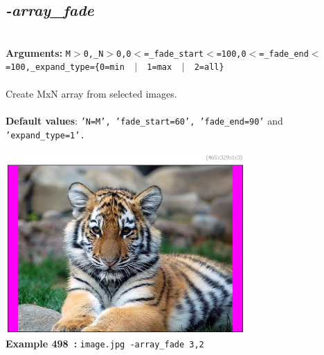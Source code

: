\documentclass[a4paper,11pt,twoside]{book}
\begin{document}
\subsection{\emph{-array\_fade} }\vspace*{-0.5em}
~\\\textbf{Arguments: } 
{\small \texttt{M$>$0,\_N$>$0,0$<$=\_fade\_start$<$=100,0$<$=\_fade\_end$<$=100,\_expand\_type=\{0=min ~$|$~ 1=max ~$|$~ 2=all\}}}\\~\\
Create MxN array from selected images.
~\\~\\\textbf{Default values}: {\small \texttt{'N=M', 'fade\_start=60', 'fade\_end=90'} and \texttt{'expand\_type=1'.}}
\begin{center}\includegraphics[keepaspectratio=true,height=7cm,width=\textwidth]{img/gmic_def498.jpg}\\
{\footnotesize \textbf{Example 498~:} \texttt{image.jpg -array\_fade 3,2}}
\end{center}
\end{document}

